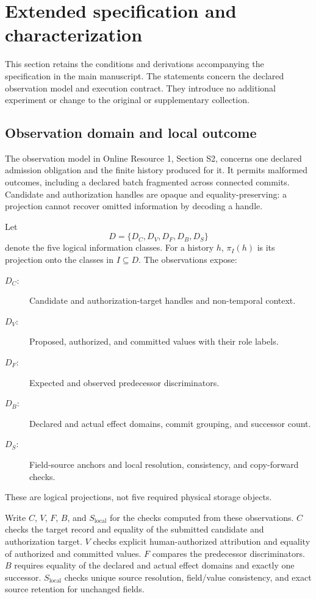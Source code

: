 
\section{Extended specification and characterization}
\label{app:extended-specification}
This section retains the conditions and derivations accompanying the specification in the main manuscript. The statements concern the declared observation model and execution contract. They introduce no additional experiment or change to the original or supplementary collection.

\subsection{Observation domain and local outcome}
\label{app:observation-domain}
The observation model in Online Resource 1, Section S2, concerns one declared admission obligation and the finite history produced for it. It permits malformed outcomes, including a declared batch fragmented across connected commits. Candidate and authorization handles are opaque and equality-preserving: a projection cannot recover omitted information by decoding a handle.

Let
\[
  D=\{D_C,D_V,D_F,D_B,D_S\}
\]
denote the five logical information classes. For a history $h$, $\pi_I(h)$ is its projection onto the classes in $I\subseteq D$. The observations expose:
\begin{description}
\item[$D_C$:] Candidate and authorization-target handles and non-temporal context.
\item[$D_V$:] Proposed, authorized, and committed values with their role labels.
\item[$D_F$:] Expected and observed predecessor discriminators.
\item[$D_B$:] Declared and actual effect domains, commit grouping, and successor count.
\item[$D_S$:] Field-source anchors and local resolution, consistency, and copy-forward checks.
\end{description}
These are logical projections, not five required physical storage objects.

Write $C$, $V$, $F$, $B$, and $S_{\mathrm{local}}$ for the checks computed from these observations. $C$ checks the target record and equality of the submitted candidate and authorization target. $V$ checks explicit human-authorized attribution and equality of authorized and committed values. $F$ compares the predecessor discriminators. $B$ requires equality of the declared and actual effect domains and exactly one successor. $S_{\mathrm{local}}$ checks unique source resolution, field/value consistency, and exact source retention for unchanged fields.

